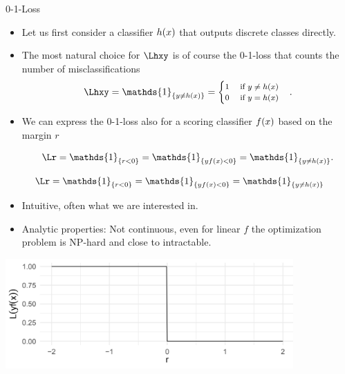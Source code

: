 \begin{vbframe}{0-1-Loss}

\begin{itemize}
  \item Let us first consider a classifier $h(x)$ that outputs discrete classes directly. 
  \item The most natural choice for $\Lhxy$ is of course the 0-1-loss that counts the number of misclassifications
  $$
  \Lhxy = \mathds{1}_{\{y \ne \hx\}} =
     \footnotesize \begin{cases} 1 \quad \text{ if } y \ne \hx \\ 0 \quad    \text{ if } y = \hx  \end{cases}.
  $$
  \item We can express the 0-1-loss also for a scoring classifier $f(x)$ based on the margin $r$

  $$
  \Lr = \mathds{1}_{\{r < 0\}} = \mathds{1}_{\{y\fx < 0\}} = \mathds{1}_{\{y \neq \hx\}}.
  $$

\end{itemize}


\framebreak 

$$
  \Lr = \mathds{1}_{\{r < 0\}} = \mathds{1}_{\{y\fx < 0\}} = \mathds{1}_{\{y \neq \hx\}} 
$$

\begin{itemize}
\item Intuitive, often what we are interested in.
\item Analytic properties:  Not continuous, even for linear $f$ the optimization problem is NP-hard and close to intractable.
\end{itemize}

\begin{center}
\includegraphics[width = 11cm ]{figure_man/0-1-loss.png} \\
\end{center}


\end{vbframe}

